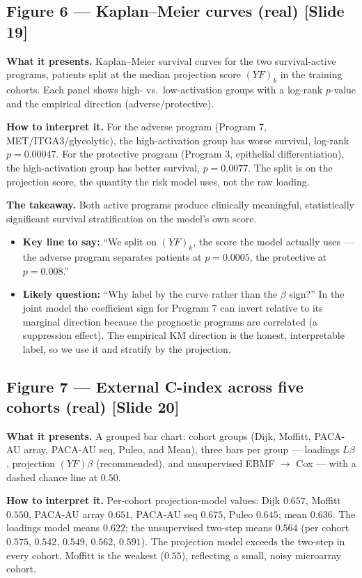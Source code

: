 \documentclass[11pt]{article}
\newcommand{\sectionlabel}[1]{\textbf{#1}}
\begin{document}
\subsection*{Figure 6 --- Kaplan--Meier curves (real) [Slide 19]}
\sectionlabel{What it presents.} Kaplan--Meier survival curves for the two survival-active programs,
patients split at the median projection score $(YF)_k$ in the training cohorts. Each panel shows
high- vs.\ low-activation groups with a log-rank $p$-value and the empirical direction
(adverse/protective).

\sectionlabel{How to interpret it.} For the adverse program (Program 7, MET/ITGA3/glycolytic), the
high-activation group has worse survival, log-rank $p = 0.00047$. For the protective program
(Program 3, epithelial differentiation), the high-activation group has better survival, $p = 0.0077$.
The split is on the projection score, the quantity the risk model uses, not the raw loading.

\sectionlabel{The takeaway.} Both active programs produce clinically meaningful, statistically
significant survival stratification on the model's own score.

\begin{itemize}
\item \sectionlabel{Key line to say:} ``We split on $(YF)_k$, the score the model actually uses ---
the adverse program separates patients at $p = 0.0005$, the protective at $p = 0.008$.''
\item \sectionlabel{Likely question:} ``Why label by the curve rather than the $\beta$ sign?'' In the
joint model the coefficient sign for Program 7 can invert relative to its marginal direction because
the prognostic programs are correlated (a suppression effect). The empirical KM direction is the
honest, interpretable label, so we use it and stratify by the projection.
\end{itemize}

\subsection*{Figure 7 --- External C-index across five cohorts (real) [Slide 20]}
\sectionlabel{What it presents.} A grouped bar chart: cohort groups (Dijk, Moffitt, PACA-AU array,
PACA-AU seq, Puleo, and Mean), three bars per group --- loadings $L\beta$, projection $(YF)\beta$
(recommended), and unsupervised EBMF $\to$ Cox --- with a dashed chance line at $0.50$.

\sectionlabel{How to interpret it.} Per-cohort projection-model values: Dijk $0.657$, Moffitt
$0.550$, PACA-AU array $0.651$, PACA-AU seq $0.675$, Puleo $0.645$; mean $0.636$. The loadings model
means $0.622$; the unsupervised two-step means $0.564$ (per cohort $0.575$, $0.542$, $0.549$,
$0.562$, $0.591$). The projection model exceeds the two-step in every cohort. Moffitt is the weakest
($0.55$), reflecting a small, noisy microarray cohort.
\end{document}
